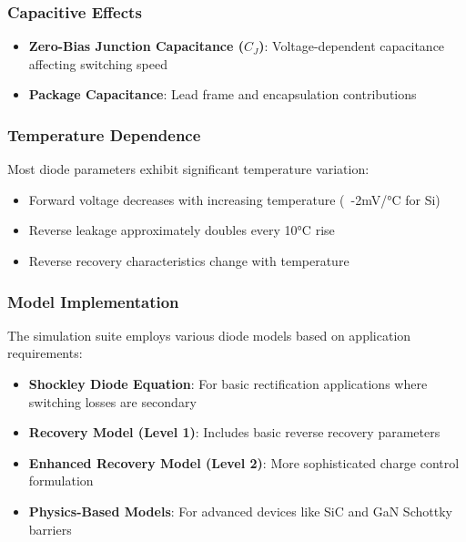 \subsubsection{Capacitive Effects}
\begin{itemize}
    \item \textbf{Zero-Bias Junction Capacitance ($C_J$)}: Voltage-dependent capacitance affecting switching speed
    \item \textbf{Package Capacitance}: Lead frame and encapsulation contributions
\end{itemize}

\subsubsection{Temperature Dependence}
Most diode parameters exhibit significant temperature variation:
\begin{itemize}
    \item Forward voltage decreases with increasing temperature (~-2mV/°C for Si)
    \item Reverse leakage approximately doubles every 10°C rise
    \item Reverse recovery characteristics change with temperature
\end{itemize}

\subsubsection{Model Implementation}
The simulation suite employs various diode models based on application requirements:
\begin{itemize}
    \item \textbf{Shockley Diode Equation}: For basic rectification applications where switching losses are secondary
    \item \textbf{Recovery Model (Level 1)}: Includes basic reverse recovery parameters
    \item \textbf{Enhanced Recovery Model (Level 2)}: More sophisticated charge control formulation
    \item \textbf{Physics-Based Models}: For advanced devices like SiC and GaN Schottky barriers
\end{itemize}

